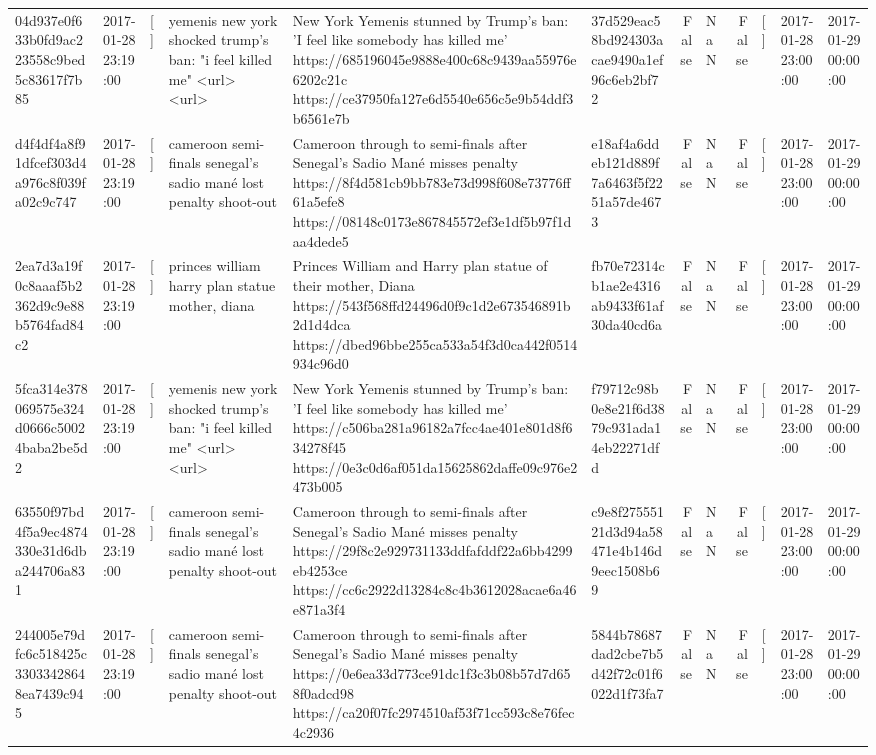 \begin{tabular}{llllllrlrlll}
04d937e0f633b0fd9ac223558c9bed5c83617f7b85 & 2017-01-28 23:19:00 & [] & yemenis new york shocked trump's ban: "i feel killed me" <url> <url> & New York Yemenis stunned by Trump's ban: 'I feel like somebody has killed me' https://685196045e9888e400c68c9439aa55976e6202c21c https://ce37950fa127e6d5540e656c5e9b54ddf3b6561e7b & 37d529eac58bd924303acae9490a1ef96c6eb2bf72 & False & NaN & False & [] & 2017-01-28 23:00:00 & 2017-01-29 00:00:00 \\
d4f4df4a8f91dfcef303d4a976c8f039fa02c9c747 & 2017-01-28 23:19:00 & [] & cameroon semi-finals senegal's sadio mané lost penalty shoot-out & Cameroon through to semi-finals after Senegal’s Sadio Mané misses penalty https://8f4d581cb9bb783e73d998f608e73776ff61a5efe8 https://08148c0173e867845572ef3e1df5b97f1daa4dede5 & e18af4a6ddeb121d889f7a6463f5f2251a57de4673 & False & NaN & False & [] & 2017-01-28 23:00:00 & 2017-01-29 00:00:00 \\
2ea7d3a19f0c8aaaf5b2362d9c9e88b5764fad84c2 & 2017-01-28 23:19:00 & [] & princes william harry plan statue mother, diana & Princes William and Harry plan statue of their mother, Diana https://543f568ffd24496d0f9c1d2e673546891b2d1d4dca https://dbed96bbe255ca533a54f3d0ca442f0514934c96d0 & fb70e72314cb1ae2e4316ab9433f61af30da40cd6a & False & NaN & False & [] & 2017-01-28 23:00:00 & 2017-01-29 00:00:00 \\
5fca314e378069575e324d0666c50024baba2be5d2 & 2017-01-28 23:19:00 & [] & yemenis new york shocked trump's ban: "i feel killed me" <url> <url> & New York Yemenis stunned by Trump's ban: 'I feel like somebody has killed me' https://c506ba281a96182a7fcc4ae401e801d8f634278f45 https://0e3c0d6af051da15625862daffe09c976e2473b005 & f79712c98b0e8e21f6d3879c931ada14eb22271dfd & False & NaN & False & [] & 2017-01-28 23:00:00 & 2017-01-29 00:00:00 \\
63550f97bd4f5a9ec4874330e31d6dba244706a831 & 2017-01-28 23:19:00 & [] & cameroon semi-finals senegal's sadio mané lost penalty shoot-out & Cameroon through to semi-finals after Senegal’s Sadio Mané misses penalty https://29f8c2e929731133ddfafddf22a6bb4299eb4253ce https://cc6c2922d13284c8c4b3612028acae6a46e871a3f4 & c9e8f27555121d3d94a58471e4b146d9eec1508b69 & False & NaN & False & [] & 2017-01-28 23:00:00 & 2017-01-29 00:00:00 \\
244005e79dfc6c518425c33033428648ea7439c945 & 2017-01-28 23:19:00 & [] & cameroon semi-finals senegal's sadio mané lost penalty shoot-out & Cameroon through to semi-finals after Senegal’s Sadio Mané misses penalty https://0e6ea33d773ce91dc1f3c3b08b57d7d658f0adcd98 https://ca20f07fc2974510af53f71cc593c8e76fec4c2936 & 5844b78687dad2cbe7b5d42f72c01f6022d1f73fa7 & False & NaN & False & [] & 2017-01-28 23:00:00 & 2017-01-29 00:00:00 \\

\end{tabular}
